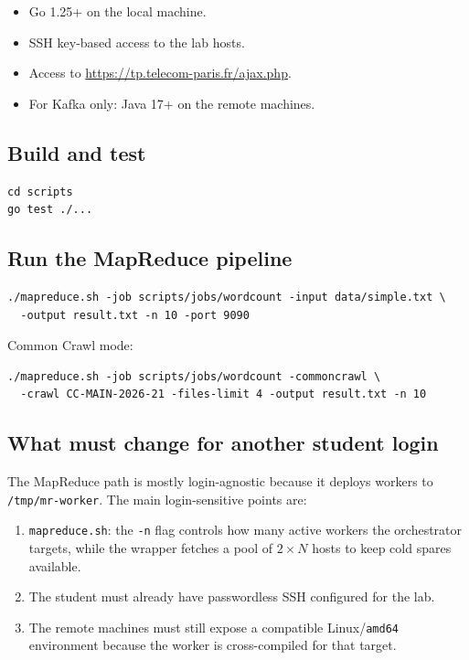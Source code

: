 \documentclass[11pt,a4paper]{article}
\begin{document}
\begin{itemize}[leftmargin=1.5em]
  \item Go 1.25+ on the local machine.
  \item SSH key-based access to the lab hosts.
  \item Access to \url{https://tp.telecom-paris.fr/ajax.php}.
  \item For Kafka only: Java 17+ on the remote machines.
\end{itemize}

\subsection{Build and test}

\begin{lstlisting}[style=codeblock]
cd scripts
go test ./...
\end{lstlisting}

\subsection{Run the MapReduce pipeline}

\begin{lstlisting}[style=codeblock]
./mapreduce.sh -job scripts/jobs/wordcount -input data/simple.txt \
  -output result.txt -n 10 -port 9090
\end{lstlisting}

Common Crawl mode:

\begin{lstlisting}[style=codeblock]
./mapreduce.sh -job scripts/jobs/wordcount -commoncrawl \
  -crawl CC-MAIN-2026-21 -files-limit 4 -output result.txt -n 10
\end{lstlisting}

\subsection{What must change for another student login}

The MapReduce path is mostly login-agnostic because it deploys workers to
\texttt{/tmp/mr-worker}. The main login-sensitive points are:

\begin{enumerate}[leftmargin=1.5em]
  \item \texttt{mapreduce.sh}: the \texttt{-n} flag controls how many active
  workers the orchestrator targets, while the wrapper fetches a pool of
  \(2 \times N\) hosts to keep cold spares available.
  \item The student must already have passwordless SSH configured for the lab.
  \item The remote machines must still expose a compatible Linux/\texttt{amd64}
  environment because the worker is cross-compiled for that target.
\end{enumerate}
\end{document}
